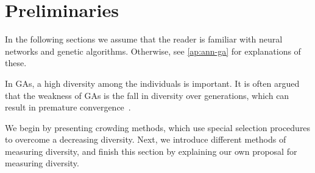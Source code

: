 \section{Preliminaries}
\label{sec:preliminaries}

In the following sections we assume that the reader is familiar with neural networks and genetic algorithms. Otherwise, see \cref{ap:ann-ga} for explanations of these. 

In GAs, a high diversity among the individuals is important. It is often argued that the weakness of GAs is the fall in diversity over generations, which can result in premature convergence~\cite{diaz2007empirical, 1266373,Zitzler00comparisonof}.

We begin by presenting crowding methods, which use special selection procedures to overcome a decreasing diversity. Next, we introduce different methods of measuring diversity, and finish this section by explaining our own proposal for measuring diversity.





